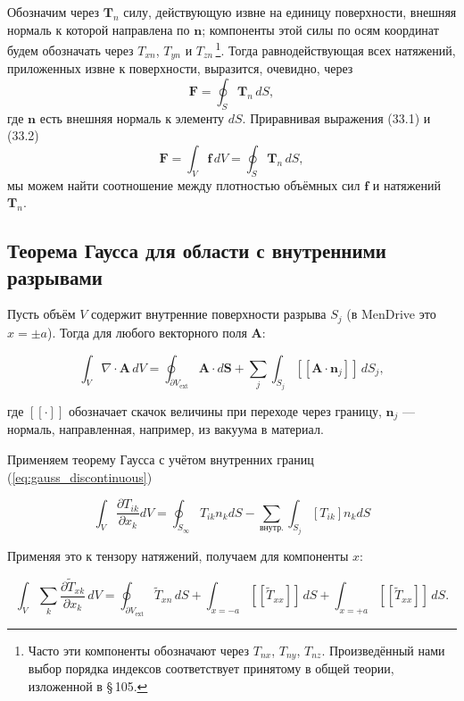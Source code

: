 \documentclass[a4paper,10pt]{article}
\newcommand{\modblock}[1]{\colorbox{modcolor!10}{\parbox{\dimexpr\linewidth-2\fboxsep}{#1}}}
\begin{document}
Обозначим через $\mathbf{T}_n$ силу, действующую извне на единицу
поверхности, внешняя нормаль к которой направлена по $\mathbf{n}$;
компоненты этой силы по осям координат будем обозначать через $T_{xn}$,
$T_{yn}$ и $T_{zn}$\,\footnote{Часто эти компоненты обозначают через
$T_{nx}$, $T_{ny}$, $T_{nz}$. Произведённый нами выбор порядка
индексов соответствует принятому в общей теории, изложенной в
§\,105.}. Тогда равнодействующая всех натяжений, приложенных извне
к поверхности, выразится, очевидно, через
\begin{equation}
    \mathbf{F} = \oint_S \mathbf{T}_n\,dS,
    \tag{33.2}
\end{equation}
где $\mathbf{n}$ есть внешняя нормаль к элементу $dS$. Приравнивая
выражения (33.1) и (33.2)
\begin{equation}
    \mathbf{F} = \int_V \mathbf{f}\,dV = \oint_S \mathbf{T}_n\,dS,
    \tag{33.3}
\end{equation}
мы можем найти соотношение между плотностью объёмных сил $\mathbf{f}$
и натяжений $\mathbf{T}_n$.


\modblock{


\subsection{Теорема Гаусса для области с внутренними разрывами}

Пусть объём $V$ содержит внутренние поверхности разрыва $S_j$ (в MenDrive это $x = \pm a$). Тогда для любого векторного поля $\mathbf{A}$:

$$
\int_V \nabla \cdot \mathbf{A} \, dV = \oint_{\partial V_{\text{ext}}} \mathbf{A} \cdot d\mathbf{S} + \sum_j \int_{S_j} [\![ \mathbf{A} \cdot \mathbf{n}_j ]\!] \, dS_j,
$$

где $[\![ \cdot ]\!]$ обозначает скачок величины при переходе через границу, $\mathbf{n}_j$ — нормаль, направленная, например, из вакуума в материал.

Применяем теорему Гаусса с учётом внутренних границ (\ref{eq:gauss_discontinuous})

\begin{equation}
\int_V \frac{\partial T_{ik}}{\partial x_k} dV = \oint_{S_\infty} T_{ik} n_k dS
- \sum_{\text{внутр.}} \int_{S_j} [T_{ik}] n_k dS
\label{eq:gauss_discontinuous}
\end{equation}

Применяя это к тензору натяжений, получаем для компоненты $x$:

$$
\int_V \sum_k \frac{\partial \tilde{T}_{xk}}{\partial x_k} \, dV = \oint_{\partial V_{\text{ext}}} \tilde{T}_{xn} \, dS + \int_{x=-a} [\![ \tilde{T}_{xx} ]\!] \, dS + \int_{x=+a} [\![ \tilde{T}_{xx} ]\!] \, dS.
$$
}
\end{document}
